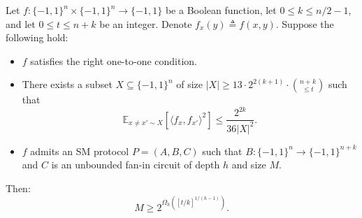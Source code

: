 \setcounter{nttheorem}{8}
\begin{nttheorem}
Let $f:\{-1,1\}^n\times\{-1,1\}^n\to\{-1,1\}$ be a Boolean function, let $0\leq k\leq n/2-1$, and let $0\leq t\leq n+k$ be an integer. Denote $f_x(y)\triangleq f(x,y)$. Suppose the following hold:
\begin{itemize}
\item $f$ satisfies the right one-to-one condition.
\item There exists a subset $X\subseteq\{-1,1\}^n$ of size $|X|\geq13\cdot2^{2(k+1)}\cdot\binom{n+k}{\leq t}$ such that
\[\mathbb E_{x\ne x'\sim X}[\langle f_x,f_{x'}\rangle^2]\leq\frac{2^{2k}}{36|X|^2}.\]
\item $f$ admits an SM protocol $P=(A,B,C)$ such that $B:\{-1,1\}^n\to\{-1,1\}^{n+k}$ and $C$ is an unbounded fan-in circuit of depth $h$ and size $M$.
\end{itemize}
Then:
\[M\geq2^{\Omega_h([t/k]^{1/(h-1)})}.\]
\end{nttheorem}
